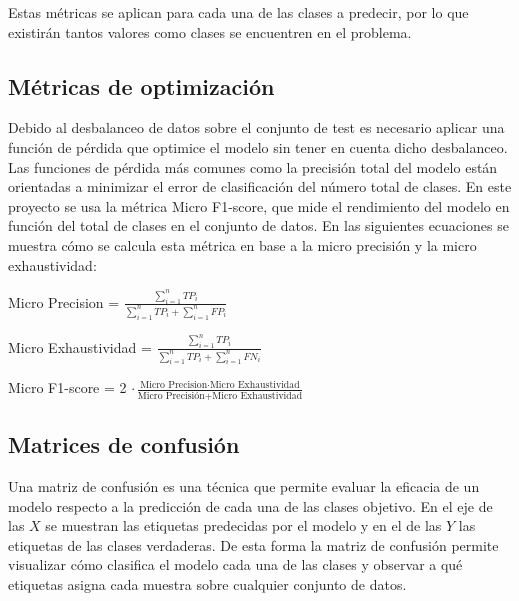         Estas métricas se aplican para cada una de las clases a predecir, por lo que existirán tantos valores como clases se encuentren en el problema.

        \subsection{Métricas de optimización}

            Debido al desbalanceo de datos sobre el conjunto de test es necesario aplicar una función de pérdida que optimice el modelo sin tener en cuenta dicho desbalanceo. Las funciones de pérdida más comunes como la precisión total del modelo están orientadas a minimizar el error de clasificación del número total de clases. En este proyecto se usa la métrica Micro F1-score, que mide el rendimiento del modelo en función del total de clases en el conjunto de datos. En las siguientes ecuaciones se muestra cómo se calcula esta métrica en base a la micro precisión y la micro exhaustividad:

                \begin{center}
                    Micro Precision =  $\frac{ \sum_{i=1} ^ {n} TP_i} {\sum_{i = 1} ^ {n} TP_i + \sum_{i = 1} ^ {n} FP_i}$
                \end{center}

                \begin{center}
                    Micro Exhaustividad = $\frac{ \sum_{i=1} ^ {n} TP_i} {\sum_{i = 1} ^ {n} TP_i + \sum_{i = 1} ^ {n} FN_i}$
                \end{center}

                \begin{center}
                    Micro F1-score =  2 $\cdot \frac{\text{Micro Precision} \cdot \text{Micro Exhaustividad}} {\text{Micro Precisión} + \text{Micro Exhaustividad}}$
                \end{center}

        \subsection{Matrices de confusión}

        Una matriz de confusión es una técnica que permite evaluar la eficacia de un modelo respecto a la predicción de cada una de las clases objetivo. En el eje de las $X$ se muestran las etiquetas predecidas por el modelo y en el de las $Y$ las etiquetas de las clases verdaderas. De esta forma la matriz de confusión permite visualizar cómo clasifica el modelo cada una de las clases y observar a qué etiquetas asigna cada muestra sobre cualquier conjunto de datos.\\

